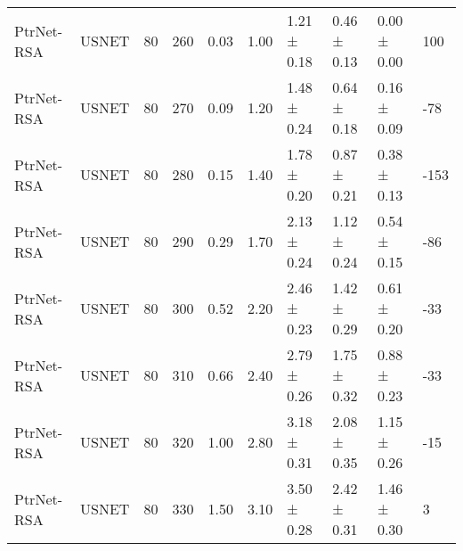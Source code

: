 \begin{longtable}[!htbp]{llll|lllll|l}
PtrNet-RSA           & USNET             & 80                   & 260                                                               & 0.03 & \multicolumn{1}{l|}{1.00}       & 1.21 ± 0.18 & 0.46 ± 0.13      & 0.00 ± 0.00                  & 100                                                                                    \\
PtrNet-RSA           & USNET             & 80                   & 270                                                               & 0.09 & \multicolumn{1}{l|}{1.20}     & 1.48 ± 0.24 & 0.64 ± 0.18      & 0.16 ± 0.09                  & -78                                                                                    \\
PtrNet-RSA           & USNET             & 80                   & 280                                                               & 0.15 & \multicolumn{1}{l|}{1.40}     & 1.78 ± 0.20 & 0.87 ± 0.21      & 0.38 ± 0.13                  & -153                                                                                    \\
PtrNet-RSA           & USNET             & 80                   & 290                                                               & 0.29 & \multicolumn{1}{l|}{1.70}     & 2.13 ± 0.24 & 1.12 ± 0.24      & 0.54 ± 0.15                  & -86                                                                                    \\
PtrNet-RSA           & USNET             & 80                   & 300                                                               & 0.52 & \multicolumn{1}{l|}{2.20}     & 2.46 ± 0.23 & 1.42 ± 0.29      & 0.61 ± 0.20                  & -33                                                                                    \\
PtrNet-RSA           & USNET             & 80                   & 310                                                               & 0.66 & \multicolumn{1}{l|}{2.40}     & 2.79 ± 0.26 & 1.75 ± 0.32      & 0.88 ± 0.23                  & -33                                                                                    \\
PtrNet-RSA           & USNET             & 80                   & 320                                                               & 1.00    & \multicolumn{1}{l|}{2.80}     & 3.18 ± 0.31 & 2.08 ± 0.35      & 1.15 ± 0.26                  & -15                                                                                    \\
PtrNet-RSA           & USNET             & 80                   & 330                                                               & 1.50  & \multicolumn{1}{l|}{3.10}     & 3.50 ± 0.28 & 2.42 ± 0.31      & 1.46 ± 0.30                  & 3                                                                                    
\end{longtable}